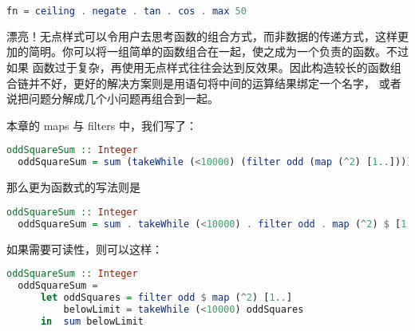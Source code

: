 \documentclass[./main.tex]{subfiles}
\begin{document}
\begin{lstlisting}[language=Haskell]
  fn = ceiling . negate . tan . cos . max 50
\end{lstlisting}

漂亮！无点样式可以令用户去思考函数的组合方式，而非数据的传递方式，这样更加的简明。你可以将一组简单的函数组合在一起，使之成为一个负责的函数。不过如果
函数过于复杂，再使用无点样式往往会达到反效果。因此构造较长的函数组合链并不好，更好的解决方案则是用语句将中间的运算结果绑定一个名字，
或者说把问题分解成几个小问题再组合到一起。

本章的 maps 与 filters 中，我们写了：

\begin{lstlisting}[language=Haskell]
  oddSquareSum :: Integer
  oddSquareSum = sum (takeWhile (<10000) (filter odd (map (^2) [1..])))
\end{lstlisting}

那么更为函数式的写法则是

\begin{lstlisting}[language=Haskell]
  oddSquareSum :: Integer
  oddSquareSum = sum . takeWhile (<10000) . filter odd . map (^2) $ [1..]
\end{lstlisting}

如果需要可读性，则可以这样：

\begin{lstlisting}[language=Haskell]
  oddSquareSum :: Integer
  oddSquareSum =
      let oddSquares = filter odd $ map (^2) [1..]
          belowLimit = takeWhile (<10000) oddSquares
      in  sum belowLimit
\end{lstlisting}
\end{document}
